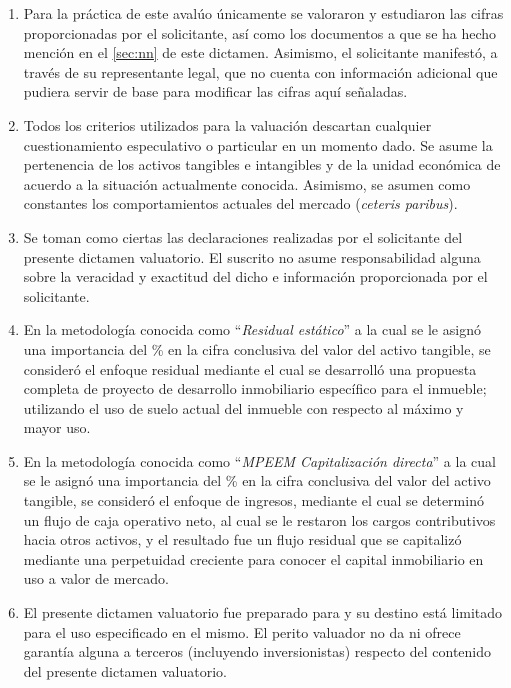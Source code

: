 \begin{enumerate}[\indent a)]
\item Para la práctica de este avalúo únicamente se valoraron y estudiaron las cifras proporcionadas por el solicitante, así como los documentos a que se ha hecho mención en el \autoref{sec:nn} de este dictamen. Asimismo, el solicitante manifestó, a través de su representante legal, que no cuenta con información adicional que pudiera servir de base para modificar las cifras aquí señaladas. 

\item Todos los criterios utilizados para la valuación descartan cualquier cuestionamiento especulativo o particular en un momento dado. Se asume la pertenencia de los activos tangibles e intangibles y de la unidad económica de acuerdo a la situación actualmente conocida. Asimismo, se asumen como constantes los comportamientos actuales del mercado (\textit{ceteris paribus}).

\item Se toman como ciertas las declaraciones realizadas por el solicitante del presente dictamen valuatorio. El suscrito no asume responsabilidad alguna sobre la veracidad y exactitud del dicho e  información proporcionada por el solicitante.

\item En la metodología conocida como ``\textit{Residual estático}'' a la cual se le asignó una importancia del \% en la cifra conclusiva del valor del activo tangible, se consideró el enfoque residual mediante el cual se desarrolló una propuesta completa de proyecto de desarrollo inmobiliario específico para el inmueble; utilizando el uso de suelo actual del inmueble con respecto al máximo y mayor uso.

\item En la metodología conocida como ``\textit{MPEEM Capitalización directa}'' a la cual se le asignó una importancia del \% en la cifra conclusiva del valor del activo tangible, se consideró el enfoque de ingresos, mediante el cual se determinó un flujo de caja operativo neto, al cual se le restaron los cargos contributivos hacia otros activos, y el resultado fue un flujo residual que se capitalizó mediante una perpetuidad creciente para conocer el capital inmobiliario en uso a valor de mercado.

\item El presente dictamen valuatorio fue preparado para \textcolor{principal}{\empresaSolicitante}{} y su destino está limitado para el uso especificado  en el mismo. El perito valuador no da ni ofrece garantía alguna a terceros (incluyendo inversionistas) respecto del contenido del presente dictamen valuatorio.

\end{enumerate}



